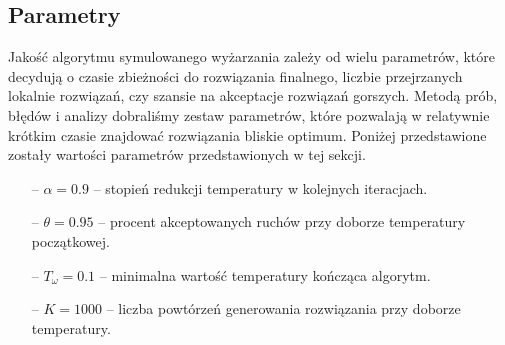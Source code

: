 \subsection{Parametry}
Jakość algorytmu symulowanego wyżarzania zależy od wielu parametrów, które decydują o czasie zbieżności do rozwiązania finalnego, liczbie przejrzanych lokalnie rozwiązań, czy szansie na akceptacje rozwiązań gorszych. Metodą prób, błędów i analizy dobraliśmy zestaw parametrów, które pozwalają w relatywnie krótkim czasie znajdować rozwiązania bliskie optimum. Poniżej przedstawione zostały wartości parametrów przedstawionych w tej sekcji.

\begin{itemize}
	\item[--] $\alpha = 0.9$ -- stopień redukcji temperatury w kolejnych iteracjach.
	\item[--] $\theta = 0.95$ -- procent akceptowanych ruchów przy doborze temperatury początkowej.
	\item[--] $T_\omega = 0.1$ -- minimalna wartość temperatury kończąca algorytm.
	\item[--] $K = 1000$ -- liczba powtórzeń generowania rozwiązania przy doborze temperatury.
\end{itemize}




